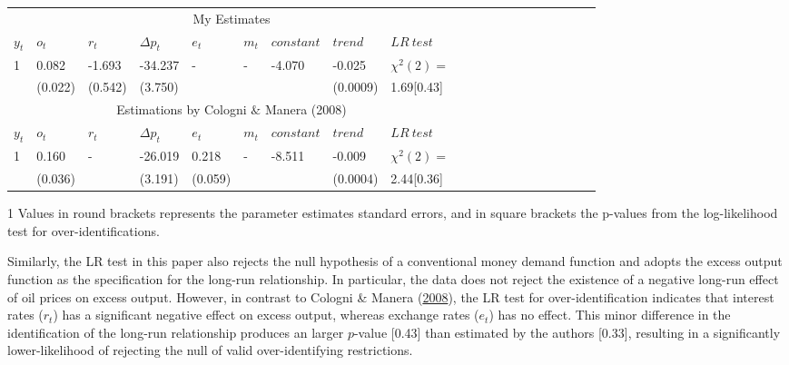 \documentclass[11pt,preprint, authoryear]{elsarticle}
\let\origtable\table
\let\endorigtable\endtable
\renewenvironment{table}[1][2] {
    \expandafter\origtable\expandafter[H]
} {
    \endorigtable
}
\numberwithin{equation}{section}
\numberwithin{figure}{section}
\numberwithin{table}{section}
\begin{document}
\begin{table}[t]
\caption{Estimated co-integrated relationships of the restricted system.}
\begin{center}
\begin{threeparttable}[b]
\begin{tabular}{@{}llllllllllllllllllll@{}}
\toprule
\multicolumn{9}{c}{My Estimates \tnote{1}}&
\\
\cmidrule(l){1-9}
\multicolumn{1}{l}{$y_t$}&
\multicolumn{1}{l}{$o_t$}&
\multicolumn{1}{l}{$r_t$}&
\multicolumn{1}{l}{$\varDelta p_t$}&
\multicolumn{1}{l}{$e_t$}&
\multicolumn{1}{l}{$m_t$}&
\multicolumn{1}{l}{$constant$}&
\multicolumn{1}{l}{$trend$}&
\multicolumn{1}{l}{$LR \ test$}&
\\
\midrule    
    1 & 0.082 & -1.693 & -34.237  & - & - & -4.070 &-0.025 & $\chi^2(2)=$\\ 
      &    (0.022)   & (0.542)  &    (3.750)      &      &  & & (0.0009)       & 1.69[0.43]          \\
\midrule
\multicolumn{9}{c}{Estimations by Cologni $\&$ Manera (2008)}&
\\
\cmidrule(l){1-9}
\multicolumn{1}{l}{$y_t$}&
\multicolumn{1}{l}{$o_t$}&
\multicolumn{1}{l}{$r_t$}&
\multicolumn{1}{l}{$\varDelta p_t$}&
\multicolumn{1}{l}{$e_t$}&
\multicolumn{1}{l}{$m_t$}&
\multicolumn{1}{l}{$constant$}&
\multicolumn{1}{l}{$trend$}&
\multicolumn{1}{l}{$LR \ test$}&
\\   
\midrule    
      1 & 0.160 & - & -26.019  & 0.218 & - & -8.511 &-0.009 & $\chi^2(2)=$\\ 
      &    (0.036)   &   &    (3.191)      & (0.059)      &  & & (0.0004)       & 2.44[0.36]          \\
\bottomrule
\end{tabular}
\begin{tablenotes}
    \item[1] Values in round brackets represents the parameter estimates standard errors, and in square brackets the p-values from the log-likelihood test for over-identifications.  
  \end{tablenotes}
\end{threeparttable}
\label{tab-6}
\end{center}
\end{table}

Similarly, the LR test in this paper also rejects the null hypothesis of
a conventional money demand function and adopts the excess output
function as the specification for the long-run relationship. In
particular, the data does not reject the existence of a negative
long-run effect of oil prices on excess output. However, in contrast to
Cologni \& Manera (\protect\hyperlink{ref-cologni2008}{2008}), the LR
test for over-identification indicates that interest rates (\(r_t\)) has
a significant negative effect on excess output, whereas exchange rates
(\(e_t\)) has no effect. This minor difference in the identification of
the long-run relationship produces an larger \(p\)-value {[}0.43{]} than
estimated by the authors {[}0.33{]}, resulting in a significantly
lower-likelihood of rejecting the null of valid over-identifying
restrictions.
\end{document}
